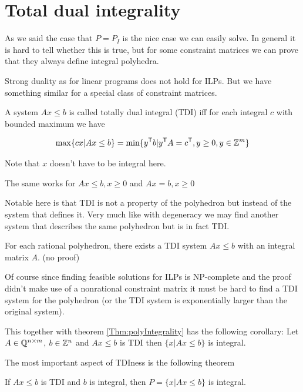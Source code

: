 \section{Total dual integrality}

As we said the case that $P=P_I$ is the nice case we can easily solve. In general it is hard to tell whether this is true, but for some constraint matrices we can prove that they always define integral polyhedra.

Strong duality as for linear programs does not hold for ILPs. But we have something similar for a special class of constraint matrices.

\begin{Def} A system $Ax\leq b$ is called totally dual integral (TDI) iff for each integral $c$ with bounded maximum we have

\[\max \{cx |Ax\leq b\} = \min \{{y}^\text{\upshape \sffamily T} b | {y}^\text{\upshape \sffamily T} A = {c}^\text{\upshape \sffamily T}, y\geq 0, y\in \mathbb{Z}^m\}\]

Note that $x$ doesn't have to be integral here.

The same works for $Ax\leq b, x\geq 0$ and $Ax=b, x\geq 0$
\end{Def}

Notable here is that TDI is not a property of the polyhedron but instead of the system that defines it. Very much like with degeneracy we may find another system that describes the same polyhedron but is in fact TDI.

\begin{thm} For each rational polyhedron, there exists a TDI system $Ax\leq b$ with an integral matrix $A$. {\small (no proof)}
\end{thm}

Of course since finding feasible solutions for ILPs is NP-complete and the proof didn't make use of a nonrational constraint matrix it must be hard to find a TDI system for the polyhedron (or the TDI system is exponentially larger than the original system).

This together with theorem \ref{Thm:polyIntegrality} has the following corollary: Let $A\in \mathbb{Q}^{n\times m}$, $b\in \mathbb{Z}^n$ and $Ax\leq b$ is TDI then $\{x|Ax\leq b\}$ is integral.

The most important aspect of TDIness is the following theorem

\begin{thm} If $Ax\leq b$ is TDI and $b$ is integral, then $P=\{x|Ax\leq b\}$ is integral.
\end{thm}

